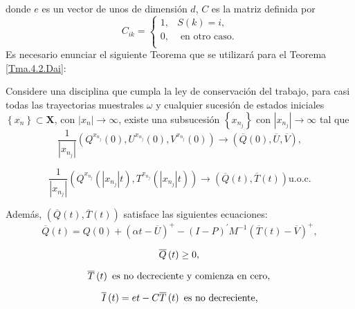 donde $e$ es un vector de unos de dimensi\'on $d$, $C$ es la
matriz definida por
\[C_{ik}=\left\{\begin{array}{cc}
1,& S\left(k\right)=i,\\
0,& \textrm{ en otro caso}.\\
\end{array}\right.
\]
Es necesario enunciar el siguiente Teorema que se utilizar\'a para
el Teorema \ref{Tma.4.2.Dai}:
\begin{Teo}
Considere una disciplina que cumpla la ley de conservaci\'on del
trabajo, para casi todas las trayectorias muestrales $\omega$ y
cualquier sucesi\'on de estados iniciales
$\left\{x_{n}\right\}\subset \mathbf{X}$, con
$|x_{n}|\rightarrow\infty$, existe una subsucesi\'on
$\left\{x_{n_{j}}\right\}$ con $|x_{n_{j}}|\rightarrow\infty$ tal
que
\begin{equation}\label{Eq.4.15}
\frac{1}{|x_{n_{j}}|}\left(Q^{x_{n_{j}}}\left(0\right),U^{x_{n_{j}}}\left(0\right),V^{x_{n_{j}}}\left(0\right)\right)\rightarrow\left(\overline{Q}\left(0\right),\overline{U},\overline{V}\right),
\end{equation}

\begin{equation}\label{Eq.4.16}
\frac{1}{|x_{n_{j}}|}\left(Q^{x_{n_{j}}}\left(|x_{n_{j}}|t\right),T^{x_{n_{j}}}\left(|x_{n_{j}}|t\right)\right)\rightarrow\left(\overline{Q}\left(t\right),\overline{T}\left(t\right)\right)\textrm{
u.o.c.}
\end{equation}

Adem\'as,
$\left(\overline{Q}\left(t\right),\overline{T}\left(t\right)\right)$
satisface las siguientes ecuaciones:
\begin{equation}\label{Eq.MF.1.3a}
\overline{Q}\left(t\right)=Q\left(0\right)+\left(\alpha
t-\overline{U}\right)^{+}-\left(I-P\right)^{'}M^{-1}\left(\overline{T}\left(t\right)-\overline{V}\right)^{+},
\end{equation}

\begin{equation}\label{Eq.MF.2.3a}
\overline{Q}\left(t\right)\geq0,\\
\end{equation}

\begin{equation}\label{Eq.MF.3.3a}
\overline{T}\left(t\right)\textrm{ es no decreciente y comienza en cero},\\
\end{equation}

\begin{equation}\label{Eq.MF.4.3a}
\overline{I}\left(t\right)=et-C\overline{T}\left(t\right)\textrm{
es no decreciente,}\\
\end{equation}


\end{Teo}
